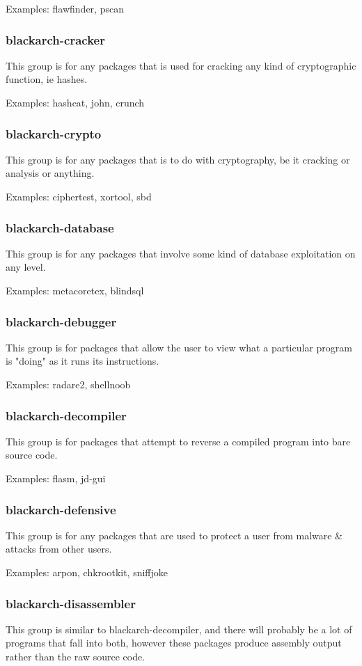 \documentclass[a4paper, oneside, 11pt]{book}
\begin{document}
Examples: flawfinder, pscan

\subsubsection{blackarch-cracker}
This group is for any packages that is used for cracking any kind of
cryptographic function, ie hashes.

Examples: hashcat, john, crunch

\subsubsection{blackarch-crypto}
This group is for any packages that is to do with cryptography, be it cracking
or analysis or anything.

Examples: ciphertest, xortool, sbd

\subsubsection{blackarch-database}
This group is for any packages that involve some kind of database exploitation
on any level.

Examples: metacoretex, blindsql

\subsubsection{blackarch-debugger}
This group is for packages that allow the user to view what a particular program
is "doing" as it runs its instructions.

Examples: radare2, shellnoob

\subsubsection{blackarch-decompiler}
This group is for packages that attempt to reverse a compiled program into bare
source code.

Examples: flasm, jd-gui

\subsubsection{blackarch-defensive}
This group is for any packages that are used to protect a user from malware \&
attacks from other users.

Examples: arpon, chkrootkit, sniffjoke

\subsubsection{blackarch-disassembler}
This group is similar to blackarch-decompiler, and there will probably be a lot
of programs that fall into both, however these packages produce assembly output
rather than the raw source code.
\end{document}
